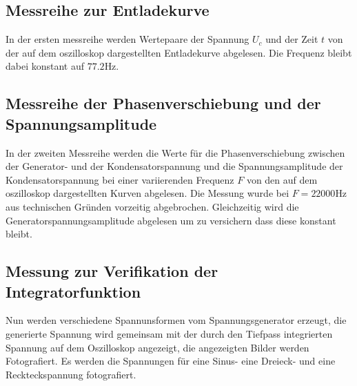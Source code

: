 \subsection{Messreihe zur Entladekurve}
In der ersten messreihe werden Wertepaare der Spannung $U_c$ und der Zeit $t$ von der auf dem oszilloskop dargestellten Entladekurve abgelesen. 
Die Frequenz bleibt dabei konstant auf $77.2\unit{\hertz}$.
\subsection{Messreihe der Phasenverschiebung und der Spannungsamplitude}
In der zweiten Messreihe werden die Werte für die Phasenverschiebung zwischen der Generator- und der Kondensatorspannung und die Spannungsamplitude der Kondensatorspannung bei einer variierenden Frequenz $F$ 
von den auf dem oszilloskop dargestellten Kurven abgelesen. Die Messung wurde bei $F = 22000\unit{\hertz}$ aus technischen Gründen vorzeitig abgebrochen.
Gleichzeitig wird die Generatorspannungsamplitude abgelesen um zu versichern dass diese konstant bleibt.
\subsection{Messung zur Verifikation der Integratorfunktion}
Nun werden verschiedene Spannunsformen vom Spannungsgenerator erzeugt, die generierte Spannung wird gemeinsam mit der durch den Tiefpass integrierten Spannung auf dem Oszilloskop angezeigt,
die angezeigten Bilder werden Fotografiert. Es werden die Spannungen für eine Sinus- eine Dreieck- und eine Reckteckspannung fotografiert.

